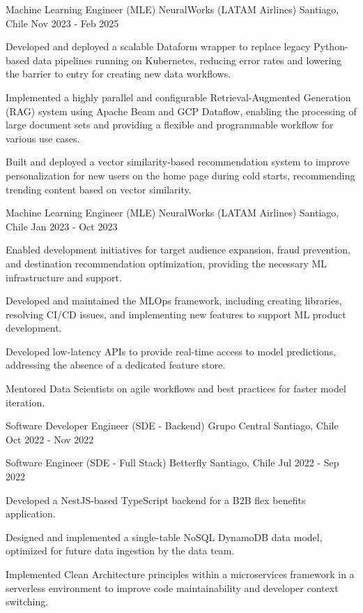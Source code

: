 \cventry
{Machine Learning Engineer (MLE)}
{NeuralWorks (LATAM Airlines)}
{Santiago, Chile}
{Nov 2023 - Feb 2025}
{
\begin{cvitems}
    \item Developed and deployed a scalable Dataform wrapper to replace legacy Python-based data pipelines running on Kubernetes, reducing error rates and lowering the barrier to entry for creating new data workflows.
    \item Implemented a highly parallel and configurable Retrieval-Augmented Generation (RAG) system using Apache Beam and GCP Dataflow, enabling the processing of large document sets and providing a flexible and programmable workflow for various use cases.
    \item Built and deployed a vector similarity-based recommendation system to improve personalization for new users on the home page during cold starts, recommending trending content based on vector similarity.
\end{cvitems}
}

\cventry
{Machine Learning Engineer (MLE)}
{NeuralWorks (LATAM Airlines)}
{Santiago, Chile}
{Jan 2023 - Oct 2023}
{
\begin{cvitems}
    \item Enabled development initiatives for target audience expansion, fraud prevention, and destination recommendation optimization, providing the necessary ML infrastructure and support.
    \item Developed and maintained the MLOps framework, including creating libraries, resolving CI/CD issues, and implementing new features to support ML product development.
    \item Developed low-latency APIs to provide real-time access to model predictions, addressing the absence of a dedicated feature store.
    \item Mentored Data Scientists on agile workflows and best practices for faster model iteration.
\end{cvitems}
}

\cventry
{Software Developer Engineer (SDE - Backend)}
{Grupo Central}
{Santiago, Chile}
{Oct 2022 - Nov 2022}
{}

\cventry
{Software Engineer (SDE - Full Stack)}
{Betterfly}
{Santiago, Chile}
{Jul 2022 - Sep 2022}
{
\begin{cvitems}
    \item Developed a NestJS-based TypeScript backend for a B2B flex benefits application.
    \item Designed and implemented a single-table NoSQL DynamoDB data model, optimized for future data ingestion by the data team.
    \item Implemented Clean Architecture principles within a microservices framework in a serverless environment to improve code maintainability and developer context switching.
\end{cvitems}
}


